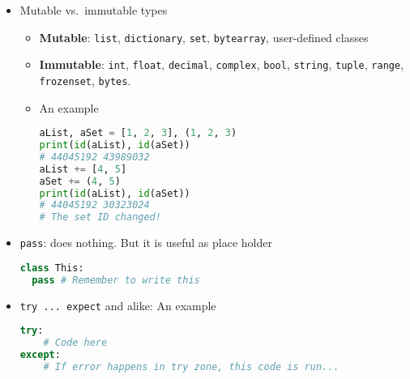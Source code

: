 \documentclass[a4paper,12pt,%
              final%
              ]{article}
\begin{document}
\begin{itemize}
\begin{itemize}
        \begin{itemize}
          \item \verb|v1='Bob'; v2='Alice'; greet="Hi, {v1}! It's {v2}"|
          \item Braces need to be escaped: e.g.\ \verb|fr'{3}'| gives \verb|3|,  \verb|fr'{{3}}'| gives \verb|{3}|. Moreover, with variables:
\begin{verbatim}
test = 'TEST'
print(f'This is a {test}')
# This is a TEST
print(f'This is a {{test}}')
# This is a {test}
print(f'This is a {{{test}}}') # 2 for escaping, 1 for variable
# This is a {TEST}
\end{verbatim}
        \end{itemize}
      \item Raw-strings: identified by \texttt{r}, the backslash is interpreted as backslash (automatically escaped). For instance, \verb|'\n'| leads to a newline, \verb|r'\n'| leads to \verb|\n|.
      \item Combine \texttt{f}- and \texttt{r}-strings: just use \verb|fr'...'|
    \end{itemize}
  \item Mutable vs.\ immutable types
    \begin{itemize}
      \item \textbf{Mutable}: \texttt{list}, \texttt{dictionary}, \texttt{set}, \texttt{bytearray}, user-defined classes
      \item \textbf{Immutable}: \texttt{int}, \texttt{float}, \texttt{decimal}, \texttt{complex}, \texttt{bool}, \texttt{string}, \texttt{tuple}, \texttt{range}, \texttt{frozenset}, \texttt{bytes}.
      \item An example
\begin{lstlisting}[language=python]
aList, aSet = [1, 2, 3], (1, 2, 3)
print(id(aList), id(aSet))
# 44045192 43989032
aList += [4, 5]
aSet += (4, 5)
print(id(aList), id(aSet))
# 44045192 30323024
# The set ID changed!
\end{lstlisting}
    \end{itemize}
  \item \verb|pass|: does nothing. But it is useful as place holder
\begin{lstlisting}[language=python]
class This:
  pass # Remember to write this
\end{lstlisting}
  \item \verb|try ... expect| and alike: An example
\begin{lstlisting}[language=python]
try:
    # Code here
except:
    # If error happens in try zone, this code is run...

\end{lstlisting}
\end{itemize}
\end{document}
